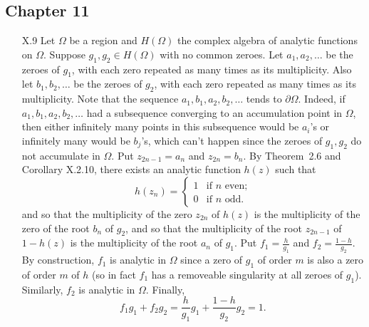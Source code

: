 \documentclass[11pt]{book}
\theoremstyle{definition}
\begin{document}
\subsection{Chapter 11}
\begin{enumerate}
    \setcounter{enumi}{3}

  \item[X.9]  Let $\Omega$ be a region and $H(\Omega)$ the complex algebra of analytic functions on $\Omega$.  Suppose $g_1,g_2\in H(\Omega)$ with no common zeroes.   Let $a_1, a_2, \ldots$ be the zeroes of $g_1$, with each zero repeated as many times as its multiplicity.  Also let $b_1, b_2, \ldots$ be the zeroes of $g_2$, with each zero repeated as many times as its multiplicity.   Note that the sequence $a_1, b_1, a_2, b_2, \ldots$ tends to $\partial \Omega$.  Indeed, if $a_1, b_1, a_2, b_2, \ldots$ had a subsequence converging to an accumulation point in $\Omega$, then either infinitely many points in this subsequence would be $a_i$'s or infinitely many would be $b_j$'s, which can't happen since the zeroes of $g_1, g_2$ do not accumulate in $\Omega$.   Put $z_{2n-1} = a_n$ and $z_{2n} = b_n$.  By Theorem~2.6 and Corollary X.2.10, there exists an analytic function $h(z)$ such that 
    \[ h(z_n) = \begin{cases} 
        1 & \text{if $n$ even;} \\ 
        0 & \text{if $n$ odd}.
      \end{cases}
      \] 
      and so that the multiplicity of the zero $z_{2n}$ of $h(z)$ is the multiplicity of the zero of the root $b_n$ of $g_2$, and so that the multiplicity of the root $z_{2n-1}$ of $1- h(z)$ is the multiplicity of the root $a_n$ of $g_1$.     Put $f_1 = \frac{h}{g_1}$ and $f_2 = \frac{1-h}{g_2}$.  By construction, $f_1$ is analytic in $\Omega$ since a zero of $g_1$ of order $m$ is also a zero of order $m$ of $h$ (so in fact $f_1$ has a removeable singularity at all zeroes of $g_1$).  Similarly, $f_2$ is analytic in $\Omega$.  Finally, 
      \[ f_1 g_1 + f_2 g_2 = \frac{h}{g_1} g_1 + \frac{1-h}{g_2} g_2 = 1. \]  


\end{enumerate}
\end{document}
